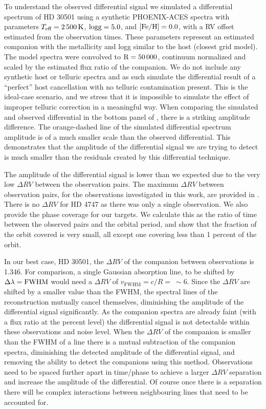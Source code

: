     To understand the observed differential signal we simulated a differential spectrum of {HD 30501} using a synthetic {PHOENIX-ACES} spectra with parameters \(T_{\textrm{eff}} = 2\,500\,\si{\kelvin}{}\), \(\rm logg=5.0\), and \(\rm \feh{}=0.0\), with a {RV} offset estimated from the observation times. These parameters represent an estimated companion \teff{} with the metallicity and logg similar to the host (closest grid model). The model spectra were convolved to \(\rm R=50\,000\), continuum normalized and scaled by the estimated flux ratio of the companion. We do not include any synthetic host or telluric spectra and as such simulate the differential result of a ``perfect'' host cancellation with no telluric contamination present. This is the ideal-case scenario, and we stress that it is impossible to simulate the effect of improper telluric correction in a meaningful way. When comparing the simulated and observed differential in the bottom panel of , there is a striking amplitude difference. The orange-dashed line of the simulated differential spectrum amplitude is of a much smaller scale than the observed differential. This demonstrates that the amplitude of the differential signal we are trying to detect is much smaller than the residuals created by this differential technique.

    The amplitude of the differential signal is lower than we expected due to the very low \(\Delta {RV}\) between the observation pairs. The maximum \(\Delta {RV}\) between observation pairs, for the observations investigated in this work, are provided in . {\red{} There is no \(\Delta {RV}\) for {HD 4747} as there was only a single observation. We also provide the phase coverage for our targets. We calculate this as the ratio of time between the observed pairs and the orbital period, and show that the fraction of the orbit covered is very small, all except one covering less than 1 percent of the orbit.}

    In our best case, {HD 30501}, the \(\Delta {RV}\) of the companion between observations is 1.346\kmps{}. For comparison, a single Gaussian absorption line, to be shifted by \(\Delta\lambda = \rm {FWHM}\) would need a \(\Delta {RV}\) of \(v_{\textrm{FWHM}} = c/R =~\sim6\)\kmps{}. Since the \(\Delta {RV}\) are shifted by a smaller value than the {FWHM}, the spectral lines of the reconstruction mutually cancel themselves, diminishing the amplitude of the differential signal significantly. As the companion spectra are already faint (with a flux ratio at the percent level) the differential signal is not detectable within these observations and noise level.
    When the \(\Delta {RV}\) of the companion is smaller than the {FWHM} of a line there is a mutual subtraction of the companion spectra, diminishing the detected amplitude of the differential signal, and removing the ability to detect the companions using this method. Observations need to be spaced further apart in time/phase to achieve a larger \(\Delta {RV}\) separation and increase the amplitude of the differential. Of course once there is a separation there will be complex interactions between neighbouring lines that need to be accounted for.

